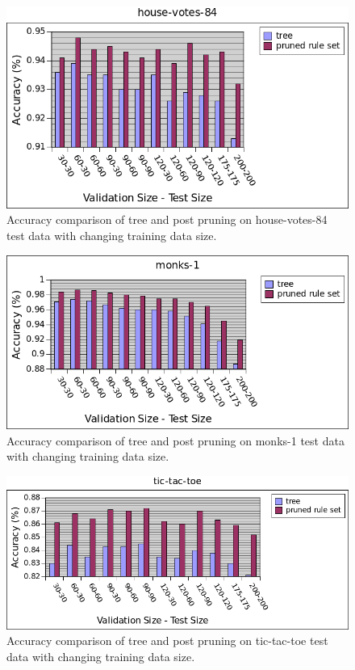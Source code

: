 \documentclass[12pt]{article}
\begin{document}
\begin{figure}[H]
  \centering
  \includegraphics[scale=0.5]{img/house-votes-84-comparison}
  \caption{Accuracy comparison of tree and post pruning on house-votes-84 test data with changing training data size.}
  \label{fig:house-comp}
\end{figure}

\begin{figure}[H]
  \centering
  \includegraphics[scale=0.5]{img/monks-1-comparison}
  \caption{Accuracy comparison of tree and post pruning on monks-1 test data with changing training data size.}
  \label{fig:monk-comp}
\end{figure}

\begin{figure}[H]
  \centering
  \includegraphics[scale=0.5]{img/tic-tac-toe-comparison}
  \caption{Accuracy comparison of tree and post pruning on tic-tac-toe test data with changing training data size.}
  \label{fig:tictactoe-comp}
\end{figure}
\end{document}
